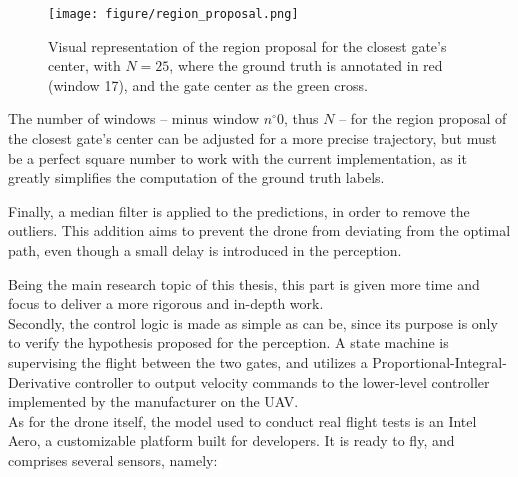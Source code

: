 \begin{figure}[h!]
	\center
	\texttt{[image: figure/region\_proposal.png]}
	\caption[Visual representation of the region proposal grid]{Visual
		representation of the region proposal for the closest gate's center, with
		$N=25$, where the ground truth is annotated in red (window 17), and the gate
		center as the green cross.}
	\label{fig:regionproposal}
\end{figure}

The number of windows -- minus window $n^{\circ}0$, thus $N$ -- for the region
proposal of the closest gate's center can be adjusted for a more precise
trajectory, but must be a perfect square number to work with the current
implementation, as it greatly simplifies the computation of the ground truth
labels.

Finally, a median filter is applied to the predictions, in order to remove the
outliers. This addition aims to prevent the drone from deviating from the
optimal path, even though a small delay is introduced in the perception.

Being the main research topic of this thesis, this part is given more time and
focus to deliver a more rigorous and in-depth work.\\


Secondly, the control logic is made as simple as can be, since its purpose is
only to verify the hypothesis proposed for the perception. A state machine is
supervising the flight between the two gates, and utilizes a
Proportional-Integral-Derivative controller to output velocity commands to the
lower-level controller implemented by the manufacturer on the UAV.\\


As for the drone itself, the model used to conduct real flight tests is an Intel
Aero, a customizable platform built for developers. It is ready to fly, and
comprises several sensors, namely:

